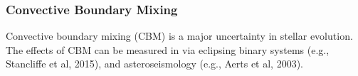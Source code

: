 {\color{purple}
\subsubsection{Convective Boundary Mixing}
}

Convective boundary mixing (CBM) is a major uncertainty in stellar evolution. The effects of CBM can be measured in via eclipsing binary systems (e.g., Stancliffe et al, 2015), and asteroseismology (e.g., Aerts et al, 2003).

